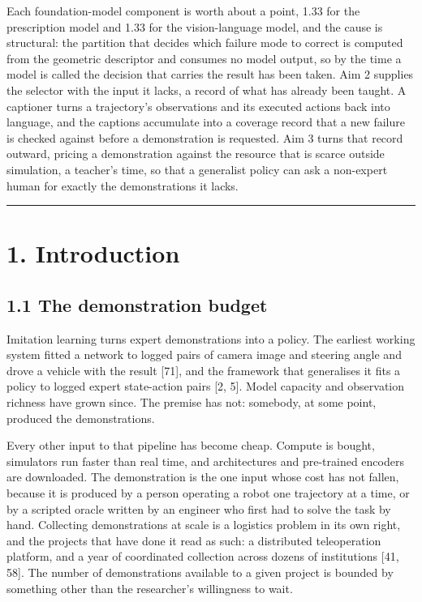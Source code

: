 \documentclass[
  11pt,
]{article}
\begin{document}
Each foundation-model component is worth about a point, 1.33 for the
prescription model and 1.33 for the vision-language model, and the cause
is structural: the partition that decides which failure mode to correct
is computed from the geometric descriptor and consumes no model output,
so by the time a model is called the decision that carries the result
has been taken. Aim 2 supplies the selector with the input it lacks, a
record of what has already been taught. A captioner turns a trajectory's
observations and its executed actions back into language, and the
captions accumulate into a coverage record that a new failure is checked
against before a demonstration is requested. Aim 3 turns that record
outward, pricing a demonstration against the resource that is scarce
outside simulation, a teacher's time, so that a generalist policy can
ask a non-expert human for exactly the demonstrations it lacks.

\begin{center}\rule{0.5\linewidth}{0.5pt}\end{center}

\hypertarget{introduction}{%
\section{1. Introduction}\label{introduction}}

\hypertarget{the-demonstration-budget}{%
\subsection{1.1 The demonstration
budget}\label{the-demonstration-budget}}

Imitation learning turns expert demonstrations into a policy. The
earliest working system fitted a network to logged pairs of camera image
and steering angle and drove a vehicle with the result {[}71{]}, and the
framework that generalises it fits a policy to logged expert
state-action pairs {[}2, 5{]}. Model capacity and observation richness
have grown since. The premise has not: somebody, at some point, produced
the demonstrations.

Every other input to that pipeline has become cheap. Compute is bought,
simulators run faster than real time, and architectures and pre-trained
encoders are downloaded. The demonstration is the one input whose cost
has not fallen, because it is produced by a person operating a robot one
trajectory at a time, or by a scripted oracle written by an engineer who
first had to solve the task by hand. Collecting demonstrations at scale
is a logistics problem in its own right, and the projects that have done
it read as such: a distributed teleoperation platform, and a year of
coordinated collection across dozens of institutions {[}41, 58{]}. The
number of demonstrations available to a given project is bounded by
something other than the researcher's willingness to wait.
\end{document}
